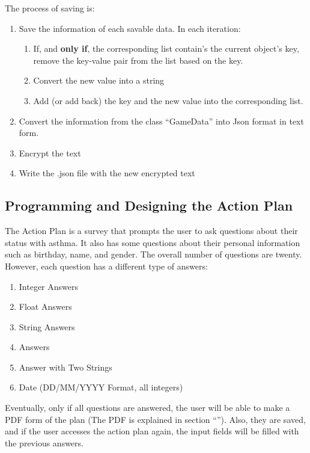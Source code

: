 The process of saving is:

\begin{enumerate}
\item{Save the information of each savable data. In each iteration:}
\begin{enumerate}
\item{If, and \textbf{only if}, the corresponding list contain's the current object's key, remove the key-value pair from the list based on the key.}
\item{Convert the new value into a string}
\item{Add (or add back) the key and the new value into the corresponding list.}
\end{enumerate}
\item{Convert the information from the class  “{\codefont GameData}” into Json format in text form.}
\item{Encrypt the text}
\item{Write the .json file with the new encrypted text}
\end{enumerate}

\subsection{Programming and Designing the Action Plan}
The Action Plan is a survey that prompts the user to ask questions about their status with asthma. It also has some questions about their personal information such as birthday, name, and gender. The overall number of questions are twenty. However, each question has a different type of answers:
\begin{enumerate}
    \item{Integer Answers}
    
    \item{Float Answers}
    
    \item{String Answers}
    
    \item{ Answers}
    
    \item{Answer with Two Strings}
    
    \item{Date (DD/MM/YYYY Format, all integers)}
\end{enumerate}
Eventually, only if all questions are answered, the user will be able to make a PDF form of the plan (The PDF is explained in section “\textbf{}”). Also, they are saved, and if the user accesses the action plan again, the input fields will be filled with the previous answers.

